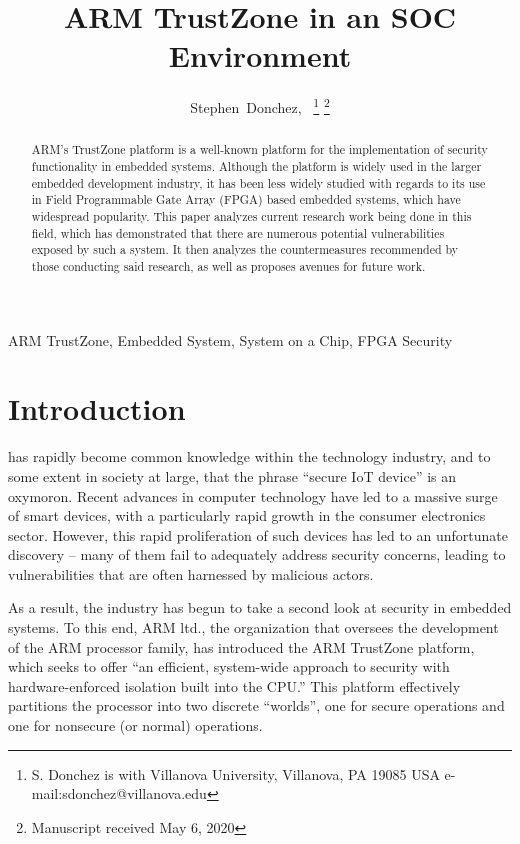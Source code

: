 \documentclass[journal]{IEEEtran}
\begin{document}
\title{ARM TrustZone in an SOC Environment}

\author{Stephen~Donchez,~%
\thanks{S. Donchez is with Villanova University, Villanova, PA 19085 USA 
\mbox{e-mail:sdonchez@villanova.edu}}%
\thanks{Manuscript received May 6, 2020}}%

\maketitle

\begin{abstract}
ARM's TrustZone platform is a well-known platform for the implementation of security
functionality in embedded systems. Although the platform is widely used in the larger
embedded development industry, it has been less widely studied with regards to its use in
Field Programmable Gate Array (FPGA) based embedded systems, which have widespread
popularity. This paper analyzes current research work being done in this field, which has 
demonstrated that there are numerous potential vulnerabilities exposed by such a system.
It then analyzes the countermeasures recommended by those conducting said research, as
well as proposes avenues for future work.
\end{abstract}

\begin{IEEEkeywords}
ARM TrustZone, Embedded System, System on a Chip, FPGA Security
\end{IEEEkeywords}

\section{Introduction}
 has rapidly become common knowledge within the technology industry, 
and to some extent in society at large, that the phrase “secure IoT device” is an oxymoron. 
Recent advances in computer technology have led to a massive surge of smart devices, with 
a particularly rapid growth in the consumer electronics sector. However, this rapid 
proliferation of such devices has led to an unfortunate discovery – many of them fail to 
adequately address security concerns, leading to vulnerabilities that are often harnessed 
by malicious actors.

As a result, the industry has begun to take a second look at security in embedded systems.
To this end, ARM ltd., the organization that oversees the development of the ARM processor
family, has introduced the ARM TrustZone platform, which seeks to offer ``an efficient, 
system-wide approach to security with hardware-enforced isolation built into the CPU.''
\cite{noauthor_trustzone_nodate} This platform effectively partitions the processor into
two discrete ``worlds'', one for secure operations and one for nonsecure (or normal) 
operations.
\end{document}
